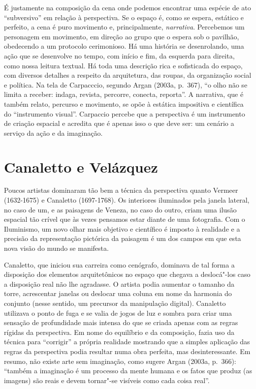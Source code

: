É justamente na composição da cena onde podemos encontrar uma espécie de
ato ``subversivo'' em relação à perspectiva. Se o espaço é, como se
espera, estático e perfeito, a cena é puro movimento e, principalmente,
\emph{narrativa}. Percebemos um personagem em movimento, em direção ao
grupo que o espera sob o pavilhão, obedecendo a um protocolo
cerimonioso. Há uma história se desenrolando, uma ação que se desenvolve
no tempo, com início e fim, da esquerda para direita, como nossa leitura
textual. Há toda uma descrição rica e sofisticada do espaço, com
diversos detalhes a respeito da arquitetura, das roupas, da organização
social e política. Na tela de Carpacccio, segundo Argan (2003a, p.~367),
``o olho não se limita a receber: indaga, revista, percorre, conecta,
reporta''. A narrativa, que é também relato, percurso e movimento, se
opõe à estática impositiva e científica do ``instrumento visual''.
Carpaccio percebe que a perspectiva é um instrumento de
criação espacial e acredita que é apenas isso o que deve ser: um cenário
a serviço da ação e da imaginação.

\chapter{Canaletto e Velázquez}

Poucos artistas dominaram tão bem a técnica da perspectiva quanto
Vermeer (1632-1675) e Canaletto (1697-1768). Os interiores iluminados
pela janela lateral, no caso de um, e as paisagens de Veneza, no caso do
outro, criam uma ilusão espacial tão crível que às vezes pensamos estar
diante de uma fotografia. Com o Iluminismo, um novo olhar mais objetivo
e científico é imposto à realidade e a precisão da representação
pictórica da paisagem é um dos campos em que esta nova visão do mundo se
manifesta.

Canaletto, que iniciou sua carreira como cenógrafo, dominava de tal
forma a disposição dos elementos arquitetônicos no espaço que chegava a
deslocá"-los caso a disposição real não lhe agradasse. O artista podia
aumentar o tamanho da torre, acrescentar janelas ou deslocar uma coluna
em nome da harmonia do conjunto (nesse sentido, um precursor da
manipulação digital). Canaletto utilizava o ponto de fuga e se valia de
jogos de luz e sombra para criar uma sensação de profundidade mais
intensa do que se criada apenas com as regras rígidas da perspectiva. Em
nome do equilíbrio e da composição, fazia uso da técnica para
``corrigir'' a própria realidade mostrando que a simples aplicação das
regras da perspectiva podia resultar numa obra perfeita, mas
desinteressante. Em resumo, não existe arte sem imaginação, como sugere
Argan (2003a, p.~366): ``também a imaginação é um processo da mente
humana e os fatos que produz (as imagens) são reais e devem tornar"-se
visíveis como cada coisa real''.

